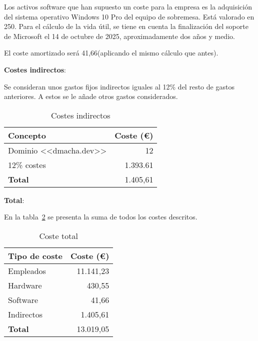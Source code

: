 Los activos software que han supuesto un coste para la empresa es la adquisición
del sistema operativo Windows 10 Pro del equipo de sobremesa. Está valorado en
250\texteuro. Para el cálculo de la vida útil, se tiene en cuenta la
finalización del soporte de Microsoft el 14 de octubre de 2025, aproximadamente
dos años y medio.

El coste amortizado será 41,66\texteuro (aplicando el mismo cálculo que antes).

\clearpage
\textbf{Costes indirectos}:

Se consideran unos gastos fijos indirectos iguales al 12\% del resto de gastos
anteriores. A estos se le añade otros gastos considerados.

\begin{table}[H]
    \centering
\begin{tabular}{lr}
\toprule
\textbf{Concepto}      & \textbf{Coste (€)}     \\ \midrule
Dominio <<dmacha.dev>>     & 12                    \\
12\% costes                 & 1.393.61                     \\ \midrule
\textbf{Total}       & 1.405,61                     \\ \midrule
\end{tabular}
\caption{Costes indirectos}
\label{tabla:indirectos}
\end{table}


\textbf{Total}:

En la tabla~\ref{tabla:total} se presenta la suma de todos los costes descritos.

\begin{table}[H]
    \centering
\begin{tabular}{lr}
\toprule
\textbf{Tipo de coste}     & \textbf{Coste (€)}     \\ \midrule
Empleados                  & 11.141,23                    \\
Hardware                   & 430,55                     \\
Software                   & 41,66                     \\
Indirectos                 & 1.405,61                     \\ \midrule
\textbf{Total}             & 13.019,05                     \\ \midrule
\end{tabular}
\caption{Coste total}
\label{tabla:total}
\end{table}

